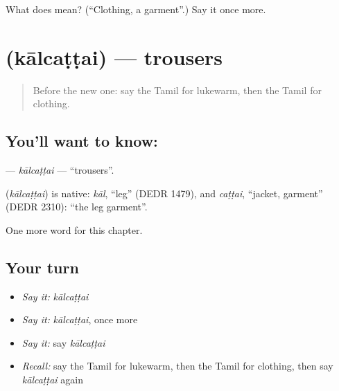 \begin{tcolorbox}[breakable,colback=teal!4,colframe=teal!35!black,title={Before you move on}]
What does  mean? (\textquotedblleft{}Clothing, a garment\textquotedblright{}.) Say it once more.
\end{tcolorbox}
\section[\texorpdfstring{\ta{கால்சட்டை} (kālcaṭṭai)}{கால்சட்டை (kālcaṭṭai)}]{ (kālcaṭṭai) — trousers}

\label{lesson:TA-C242-kalcattai}



\begin{quote}
Before the new one: say the Tamil for lukewarm, then the Tamil for clothing.
\end{quote}

\subsection*{You'll want to know: }
\textbf{} — \emph{kālcaṭṭai} — \textquotedblleft{}trousers\textquotedblright{}.

\begin{cousinweb}
\textbf{} (\emph{kālcaṭṭai}) is native: \emph{kāl}, \textquotedblleft{}leg\textquotedblright{} (DEDR 1479), and \emph{caṭṭai}, \textquotedblleft{}jacket, garment\textquotedblright{} (DEDR 2310): \textquotedblleft{}the leg garment\textquotedblright{}.
\end{cousinweb}

\begin{grammarlens}[title={What you've built}]
One more word for this chapter.
\end{grammarlens}

\subsection*{Your turn}
\begin{itemize}
\raggedright
  \item \emph{Say it:} \emph{kālcaṭṭai}
  \item \emph{Say it:} \emph{kālcaṭṭai}, once more
  \item \emph{Say it:} say \emph{kālcaṭṭai}
  \item \emph{Recall:} say the Tamil for lukewarm, then the Tamil for clothing, then say \emph{kālcaṭṭai} again
\end{itemize}

